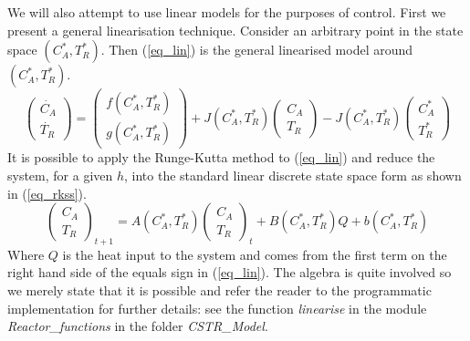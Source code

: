 \documentclass[../masters.tex]{subfiles}
\begin{document}
We will also attempt to use linear models for the purposes of control. First we present a general linearisation technique. Consider an arbitrary point in the state space $(C_A^*, T_R^*)$. Then (\ref{eq_lin}) is the general linearised model around $(C_A^*, T_R^*)$.
\begin{equation}
\begin{pmatrix}
\dot{C_A} \\ \dot{T_R}
\end{pmatrix} = \begin{pmatrix}
f(C_A^*, T_R^*) \\ g(C_A^*, T_R^*)
\end{pmatrix} + J(C_A^*, T_R^*)\begin{pmatrix}
C_A \\ T_R
\end{pmatrix} - J(C_A^*, T_R^*)\begin{pmatrix}
C_A^* \\ T_R^*
\end{pmatrix}
\label{eq_lin}
\end{equation}
It is possible to apply the Runge-Kutta method to (\ref{eq_lin}) and reduce the system, for a given $h$, into the standard linear discrete state space form as shown in (\ref{eq_rkss}). 
\begin{equation}
\begin{pmatrix}
C_A \\ T_R
\end{pmatrix}_{t+1} = A(C_A^*, T_R^*) \begin{pmatrix}
C_A \\ T_R
\end{pmatrix}_{t} + B(C_A^*, T_R^*)Q + b(C_A^*, T_R^*)
\label{eq_rkss}
\end{equation}
Where $Q$ is the heat input to the system and comes from the first term on the right hand side of the equals sign in (\ref{eq_lin}). The algebra is quite involved so we merely state that it is possible and refer the reader to the programmatic implementation for further details: see the function \textit{linearise} in the module \textit{Reactor\_functions} in the folder \textit{CSTR\_Model}.
\end{document}
